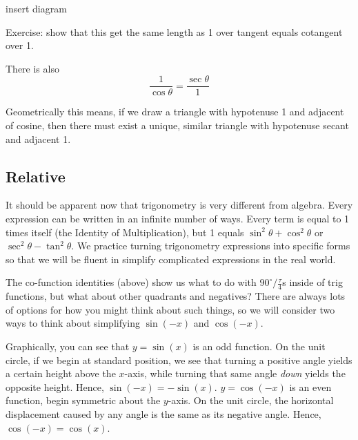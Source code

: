 insert diagram

Exercise: show that this get the same length as 1 over tangent equals cotangent over 1.

There is also
\begin{equation}
\frac{1}{\cos\theta} = \frac{\sec\theta}{1}
\end{equation}

Geometrically this means, if we draw a triangle with hypotenuse 1 and adjacent of cosine, then there must exist a unique, similar triangle with hypotenuse secant and adjacent 1.


\subsection{Relative}
It should be apparent now that trigonometry is very different from algebra.  Every expression can be 
written in an infinite number of ways.  Every term is equal to 1 times itself (the Identity of Multiplication),
but 1 equals $\sin^2\theta + \cos^2\theta$ or $\sec^2\theta-\tan^2\theta$.  We practice turning 
trigonometry expressions into specific forms so that we will be fluent in simplify complicated 
expressions in the real world.

The co-function identities (above) show us what to do with $90^\circ/\frac{\tau}{4}$s inside of
trig functions, but what about other quadrants and negatives?  There are always lots of options
for how you might think about such things, so we will consider two ways to think about
simplifying $\sin(-x)$ and $\cos(-x)$.

Graphically, you can see that $y=\sin(x)$ is an odd function.  On the unit circle, if we begin at
standard position, we see that turning a positive angle yields a certain height above the $x$-axis,
while turning that same angle \emph{down} yields the opposite height.  Hence, $\sin(-x)=-\sin(x)$.
$y=\cos(-x)$ is an even function, begin symmetric about the $y$-axis.  On the unit circle, the 
horizontal displacement caused by any angle is the same as its negative angle.  Hence,
$\cos(-x)=\cos(x)$.

